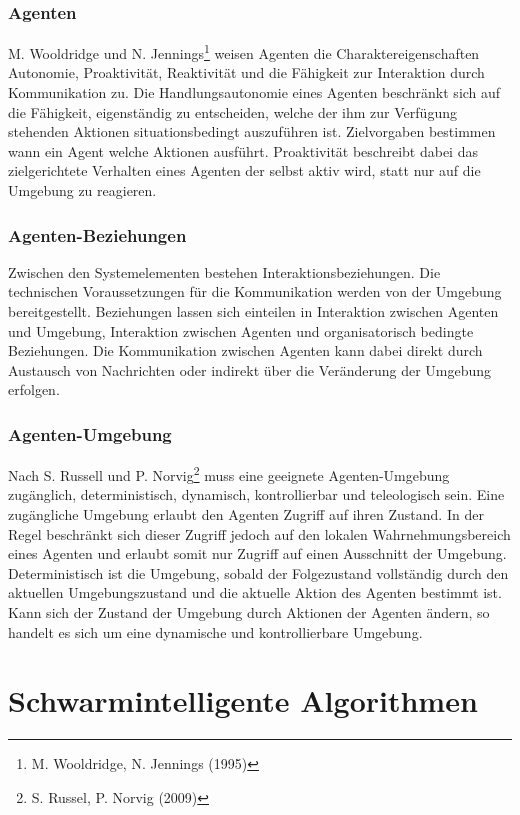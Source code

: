 \documentclass[a4paper, 11pt]{article}
\begin{document}
\subsubsection{Agenten} 
M. Wooldridge und N. Jennings\footnote{M. Wooldridge, N. Jennings (1995)} weisen Agenten die Charaktereigenschaften Autonomie, Proaktivität, Reaktivität und die Fähigkeit zur Interaktion durch Kommunikation zu. Die Handlungsautonomie eines Agenten beschränkt sich auf die Fähigkeit, eigenständig zu entscheiden, welche der ihm zur Verfügung stehenden Aktionen situationsbedingt auszuführen ist. Zielvorgaben bestimmen wann ein Agent welche Aktionen ausführt. Proaktivität beschreibt dabei das zielgerichtete Verhalten eines Agenten der selbst aktiv wird, statt nur auf die Umgebung zu reagieren.\newline
\subsubsection{Agenten-Beziehungen}
Zwischen den Systemelementen bestehen Interaktionsbeziehungen. Die technischen Voraussetzungen für die Kommunikation werden von der Umgebung bereitgestellt. Beziehungen lassen sich einteilen in Interaktion zwischen Agenten und Umgebung, Interaktion zwischen Agenten und organisatorisch bedingte Beziehungen. Die Kommunikation zwischen Agenten kann dabei direkt durch Austausch von Nachrichten oder indirekt über die Veränderung der Umgebung erfolgen.\newline
\subsubsection{Agenten-Umgebung}
Nach S. Russell und P. Norvig\footnote{S. Russel, P. Norvig (2009)} muss eine geeignete Agenten-Umgebung zugänglich, deterministisch, dynamisch, kontrollierbar und teleologisch sein. Eine zugängliche Umgebung erlaubt den Agenten Zugriff auf ihren Zustand. In der Regel beschränkt sich dieser Zugriff jedoch auf den lokalen Wahrnehmungsbereich eines Agenten und erlaubt somit nur Zugriff auf einen Ausschnitt der Umgebung. Deterministisch ist die Umgebung, sobald der Folgezustand vollständig durch den aktuellen Umgebungszustand und die aktuelle Aktion des Agenten bestimmt ist. Kann sich der Zustand der Umgebung durch Aktionen der Agenten ändern, so handelt es sich um eine dynamische und kontrollierbare Umgebung.
\newpage
\section{Schwarmintelligente Algorithmen}
\end{document}
